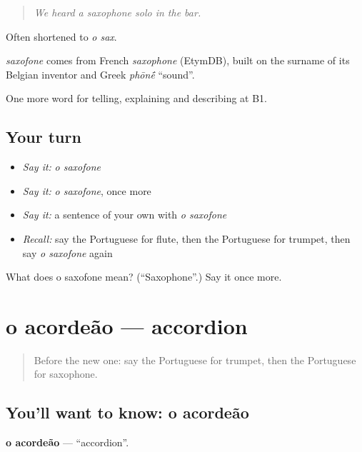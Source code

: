 \begin{quote}
\emph{We heard a saxophone solo in the bar.}
\end{quote}

Often shortened to \emph{o sax}.

\begin{cousinweb}
\emph{saxofone} comes from French \emph{saxophone} (EtymDB), built on the surname of its Belgian inventor and Greek \emph{phōn\'{\={e}}} \textquotedblleft{}sound\textquotedblright{}.
\end{cousinweb}

\begin{grammarlens}[title={What you've built}]
One more word for telling, explaining and describing at B1.
\end{grammarlens}

\subsection*{Your turn}
\begin{itemize}
\raggedright
  \item \emph{Say it:} \emph{o saxofone}
  \item \emph{Say it:} \emph{o saxofone}, once more
  \item \emph{Say it:} a sentence of your own with \emph{o saxofone}
  \item \emph{Recall:} say the Portuguese for flute, then the Portuguese for trumpet, then say \emph{o saxofone} again
\end{itemize}

\begin{tcolorbox}[breakable,colback=teal!4,colframe=teal!35!black,title={Before you move on}]
What does o saxofone mean? (\textquotedblleft{}Saxophone\textquotedblright{}.) Say it once more.
\end{tcolorbox}
\section[o acordeão]{o acordeão — accordion}

\label{lesson:PT-C517-acordeao}



\begin{quote}
Before the new one: say the Portuguese for trumpet, then the Portuguese for saxophone.
\end{quote}

\subsection*{You'll want to know: o acordeão}
\textbf{o acordeão} — \textquotedblleft{}accordion\textquotedblright{}.

